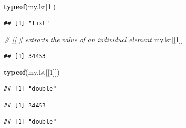 \documentclass[]{book}
\newenvironment{Shaded}{\begin{snugshade}}{\end{snugshade}}
\newcommand{\KeywordTok}[1]{\textcolor[rgb]{0.13,0.29,0.53}{\textbf{{#1}}}}
\newcommand{\DecValTok}[1]{\textcolor[rgb]{0.00,0.00,0.81}{{#1}}}
\newcommand{\CommentTok}[1]{\textcolor[rgb]{0.56,0.35,0.01}{\textit{{#1}}}}
\newcommand{\NormalTok}[1]{{#1}}
\begin{document}
\begin{Shaded}
\begin{Highlighting}[]
\KeywordTok{typeof}\NormalTok{(my.lst[}\DecValTok{1}\NormalTok{])}
\end{Highlighting}
\end{Shaded}

\begin{verbatim}
## [1] "list"
\end{verbatim}

\begin{Shaded}
\begin{Highlighting}[]
\CommentTok{# [[ ]] extracts the value of an individual element }
\NormalTok{my.lst[[}\DecValTok{1}\NormalTok{]]}
\end{Highlighting}
\end{Shaded}

\begin{verbatim}
## [1] 34453
\end{verbatim}

\begin{Shaded}
\begin{Highlighting}[]
\KeywordTok{typeof}\NormalTok{(my.lst[[}\DecValTok{1}\NormalTok{]])}
\end{Highlighting}
\end{Shaded}

\begin{verbatim}
## [1] "double"
\end{verbatim}

\begin{Shaded}
\end{Shaded}

\begin{verbatim}
## [1] 34453
\end{verbatim}

\begin{Shaded}
\end{Shaded}

\begin{verbatim}
## [1] "double"
\end{verbatim}
\end{document}
